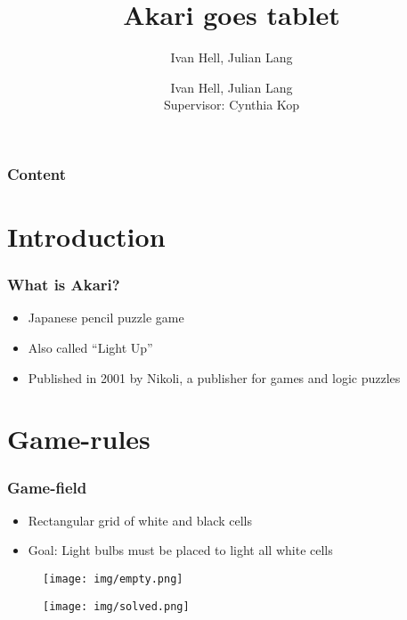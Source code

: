 \documentclass[xcolor=dvipsnames]{beamer}
\begin{document}
\title{Akari goes tablet}
\author{Ivan Hell, Julian Lang}
\author[Ivan Hell, Julian Lang]{Ivan Hell, Julian Lang{\\\vspace*{10mm}\small Supervisor: Cynthia Kop}}

\begin{frame}
\titlepage
\end{frame}

\begin{frame}
  \frametitle{Content}
  \scriptsize 
  \tableofcontents
\end{frame}


\section{Introduction}
\begin{frame}
  \frametitle{What is Akari?}
  \begin{itemize}
  \item Japanese pencil puzzle game
  \item Also called ``Light Up''
  \item Published in 2001 by Nikoli, a publisher for games and logic puzzles
  \end{itemize}
\end{frame}

\section{Game-rules}
\begin{frame}
  \frametitle{Game-field}
  \begin{itemize} 
  \item Rectangular grid of white and black cells
  \item Goal: Light bulbs must be placed to light all white cells
  \end{itemize}
{
  \begin{figure}[b]
     \texttt{[image: img/empty.png]}
  \end{figure}
}

{
  \begin{figure}[b]
     \texttt{[image: img/solved.png]}
  \end{figure}
}



\end{frame}
\end{document}
